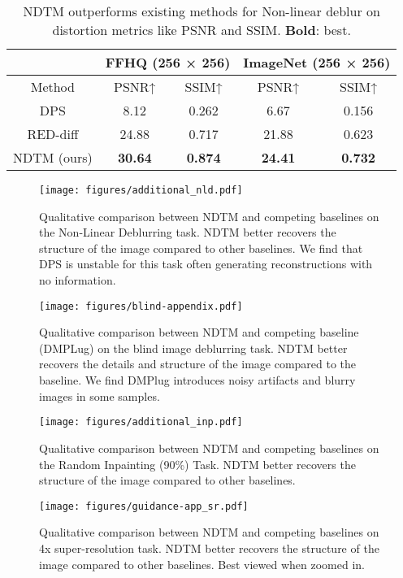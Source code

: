 \begin{table}[!ht]
\caption{NDTM outperforms existing methods for Non-linear deblur on distortion metrics like PSNR and SSIM. \textbf{Bold}: best.}
\centering
\small
\begin{tabular}{@{}c|cc|cc@{}}
\toprule
      & \multicolumn{2}{c|}{FFHQ (256 × 256)}  & \multicolumn{2}{c}{ImageNet (256 × 256)}  \\ \midrule
Method & PSNR↑ & SSIM↑ & PSNR↑ & SSIM↑ \\ \midrule
DPS         & 8.12 & 0.262 & 6.67 & 0.156  \\
RED-diff    & 24.88 & 0.717 & 21.88 & 0.623  \\ \midrule
NDTM (ours) & \textbf{30.64} & \textbf{0.874} & \textbf{24.41} & \textbf{0.732}  \\ \bottomrule
\end{tabular}
\label{table:recovery_nl_deblur}
\end{table}

\clearpage




\begin{figure}
    \centering
    \texttt{[image: figures/additional\_nld.pdf]}
    \caption{Qualitative comparison between NDTM and competing baselines on the Non-Linear Deblurring task. NDTM better recovers the structure of the image compared to other baselines. We find that DPS is unstable for this task often generating reconstructions with no information.}
    \label{fig:add_nld}
\end{figure}

\begin{figure}
    \centering
    \texttt{[image: figures/blind-appendix.pdf]}
    \caption{Qualitative comparison between NDTM and competing baseline (DMPLug) on the blind image deblurring task. NDTM better recovers the details and structure of the image compared to the baseline. We find DMPlug introduces noisy artifacts and blurry images in some samples.}
    \label{fig:add_bid}
\end{figure}

\begin{figure}
    \centering
    \texttt{[image: figures/additional\_inp.pdf]}
    \caption{Qualitative comparison between NDTM and competing baselines on the Random Inpainting (90\%) Task. NDTM better recovers the structure of the image compared to other baselines.}
    \label{fig:add_rinp}
\end{figure}

\begin{figure}
    \centering
    \texttt{[image: figures/guidance-app\_sr.pdf]}
    \caption{Qualitative comparison between NDTM and competing baselines on 4x super-resolution task. NDTM better recovers the structure of the image compared to other baselines. Best viewed when zoomed in.}
    \label{fig:add_superres}
\end{figure}
